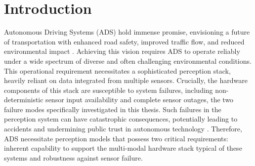 \section{Introduction} \label{Introduction}


Autonomous Driving Systems (ADS) hold immense promise, envisioning a future of transportation with enhanced road safety, improved traffic flow, and reduced environmental impact \cite{litmanAutonomousVehicleImplementationb}. Achieving this vision requires ADS to operate reliably under a wide spectrum of diverse and often challenging environmental conditions. This operational requirement necessitates a sophisticated perception stack, heavily reliant on data integrated from multiple sensors. Crucially, the hardware components of this stack are susceptible to system failures, including non-deterministic sensor input availability and complete sensor outages, the two failure modes specifically investigated in this thesis. Such failures in the perception system can have catastrophic consequences, potentially leading to accidents and undermining public trust in autonomous technology \cite{yurtseverSurveyAutonomousDriving2020}. Therefore, ADS necessitate perception models that possess two critical requirements: inherent capability to support the multi-modal hardware stack typical of these systems and robustness against sensor failure.

